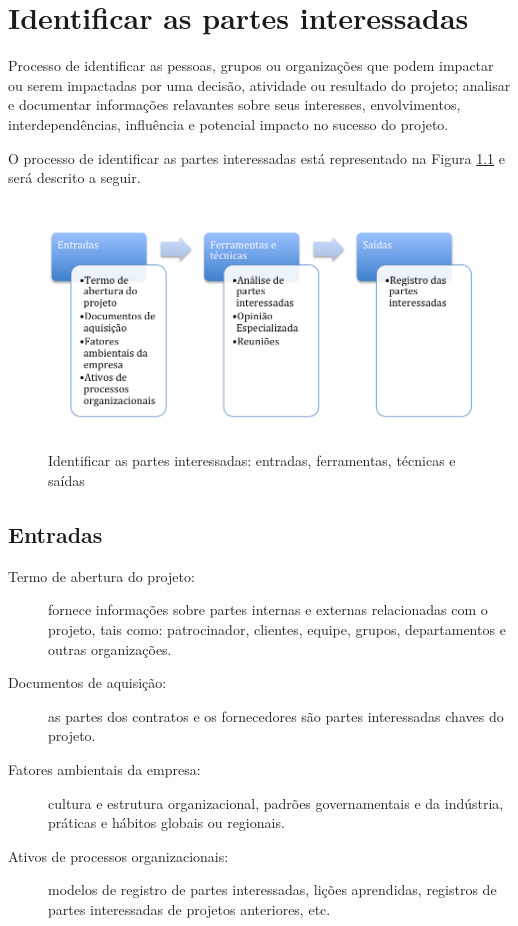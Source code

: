 \chapter{Identificar as partes interessadas}

Processo de identificar as pessoas, grupos ou organizações que podem impactar ou serem impactadas por uma decisão, atividade ou resultado do projeto; analisar e documentar informações relavantes sobre seus interesses, envolvimentos, interdependências, influência e potencial impacto no sucesso do projeto.

O processo de identificar as partes interessadas está representado na Figura \ref{fig:sh:id:efts} e será descrito a seguir.

\begin{figure}[!h]
	\centering
	\includegraphics[scale=0.5]{Figuras/stakeholders_efts_identificar.png}
	\caption{Identificar as partes interessadas: entradas, ferramentas, técnicas e saídas}
	\label{fig:sh:id:efts}
\end{figure}

\section{Entradas}

\begin{description}

	\item[Termo de abertura do projeto:] fornece informações sobre partes internas e externas relacionadas com o projeto, tais como: patrocinador, clientes, equipe, grupos, departamentos e outras organizações.
	
	\item[Documentos de aquisição:] as partes dos contratos e os fornecedores são partes interessadas chaves do projeto.
	
	\item[Fatores ambientais da empresa:] cultura e estrutura organizacional, padrões governamentais e da indústria, práticas e hábitos globais ou regionais.
	
	\item[Ativos de processos organizacionais:]	modelos de registro de partes interessadas, lições aprendidas, registros de partes interessadas de projetos anteriores, etc.

\end{description}

